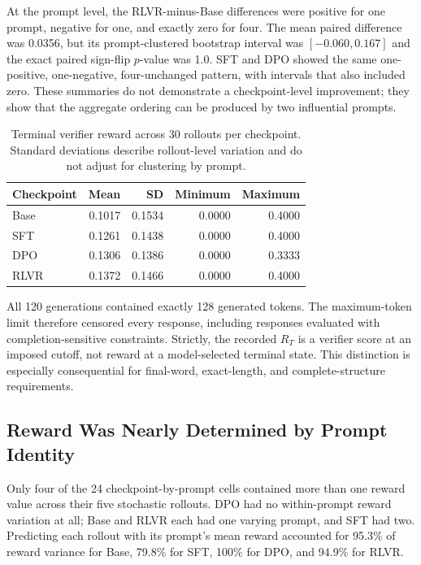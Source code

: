\documentclass[manuscript,screen,nonacm]{acmart}
\begin{document}
At the prompt level, the RLVR-minus-Base differences were positive for one
prompt, negative for one, and exactly zero for four. The mean paired difference
was 0.0356, but its prompt-clustered bootstrap interval was
$[-0.060,0.167]$ and the exact paired sign-flip $p$-value was 1.0. SFT and DPO
showed the same one-positive, one-negative, four-unchanged pattern, with
intervals that also included zero. These summaries do not demonstrate a
checkpoint-level improvement; they show that the aggregate ordering can be
produced by two influential prompts.

\begin{table}[t]
\centering
\caption{Terminal verifier reward across 30 rollouts per checkpoint. Standard
deviations describe rollout-level variation and do not adjust for clustering by
prompt.}
\label{tab:reward-summary}
\begin{tabular}{lrrrr}
\toprule
Checkpoint & Mean & SD & Minimum & Maximum \\
\midrule
Base & 0.1017 & 0.1534 & 0.0000 & 0.4000 \\
SFT  & 0.1261 & 0.1438 & 0.0000 & 0.4000 \\
DPO  & 0.1306 & 0.1386 & 0.0000 & 0.3333 \\
RLVR & 0.1372 & 0.1466 & 0.0000 & 0.4000 \\
\bottomrule
\end{tabular}
\end{table}

All 120 generations contained exactly 128 generated tokens. The maximum-token
limit therefore censored every response, including responses evaluated with
completion-sensitive constraints. Strictly, the recorded $R_T$ is a verifier
score at an imposed cutoff, not reward at a model-selected terminal state. This
distinction is especially consequential for final-word, exact-length, and
complete-structure requirements.

\subsection{Reward Was Nearly Determined by Prompt Identity}

Only four of the 24 checkpoint-by-prompt cells contained more than one reward
value across their five stochastic rollouts. DPO had no within-prompt reward
variation at all; Base and RLVR each had one varying prompt, and SFT had two.
Predicting each rollout with its prompt's mean reward accounted for 95.3\% of
reward variance for Base, 79.8\% for SFT, 100\% for DPO, and 94.9\% for RLVR.
\end{document}
